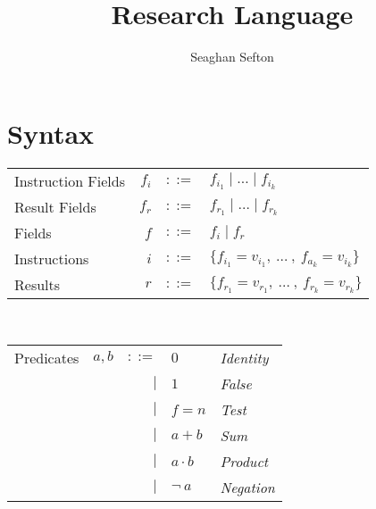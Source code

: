 \documentclass[12pt, letterpaper]{article}
\title{Research Language}
\author{Seaghan Sefton}
\begin{document}
\section{Syntax}


    \begin{tabular}{l r c l}
        Instruction Fields   & $f_{i}$   & $::=$     & $f_{i_{1}} \mid \dots \mid f_{i_{k}}$\\
        Result Fields   & $f_{r}$   & $::=$     & $f_{r_{1}} \mid \dots \mid f_{r_{k}}$\\
        Fields          & $f$       & $::=$     & $f_i \mid f_r$ \\
        Instructions         & $i$       & $::=$     & $\{f_{i_{1}} = v_{i_{1}} ,\ \dots\ ,\ f_{a_{k}} = v_{i_{k}}\}$\\
        Results         & $r$       & $::=$     & $\{f_{r_{1}} = v_{r_{1}} ,\ \dots\ ,\ f_{r_{k}} = v_{r_{k}}\}$\\
    \end{tabular}\\
    \begin{tabular}{l c r l l}
        Predicates  & $a,b$     & $::=$  & $0$          & \textit{Identity} \\
                    &           & $\mid$ & $1$          & \textit{False}    \\
                    &           & $\mid$ & $f=n$        & \textit{Test} \\  
                    &           & $\mid$ & $a + b$      & \textit{Sum}      \\
                    &           & $\mid$ & $a \cdot b$  & \textit{Product}  \\
                    &           & $\mid$ & $\neg \ a$   & \textit{Negation}
    \end{tabular}\\
\end{document}
